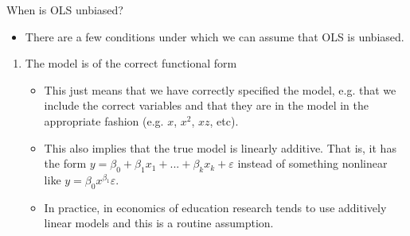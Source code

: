 \documentclass{beamer}
\begin{document}
\begin{frame}{When is OLS unbiased?}
    \begin{itemize}
        \item There are a few conditions under which we can assume that OLS is unbiased.
    \end{itemize}
    \begin{enumerate}
        \item The model is of the correct functional form \begin{itemize}\footnotesize
                 \item This just means that we have correctly specified the model, e.g. that we include the correct variables and that they are in the model in the appropriate fashion (e.g. $x$, $x^2$, $xz$, etc). \medskip
                 \item This also implies that the true model is linearly additive.  That is, it has the form $y = \beta_0 + \beta_1x_1 + ... + \beta_kx_k + \varepsilon$ instead of something nonlinear like $y = \beta_0x^{\beta_1}\varepsilon$. \medskip
                 \item In practice, in economics of education research tends to use additively linear models and this is a routine assumption.
            \end{itemize}
      \end{enumerate}
\end{frame}
\end{document}
